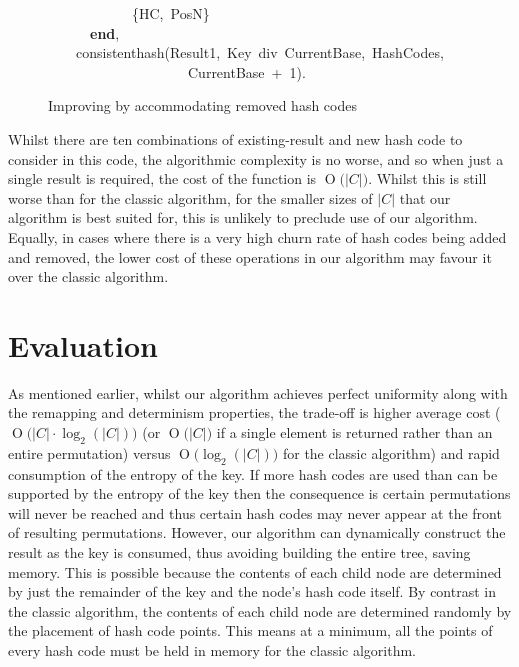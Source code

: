 \documentclass[runningheads,a4paper]{llncs}
\newcommand{\hlstd}[1]{\textcolor[rgb]{0,0,0}{#1}}
\newcommand{\hlnum}[1]{\textcolor[rgb]{0.69,0.49,0}{#1}}
\newcommand{\hlopt}[1]{\textcolor[rgb]{0,0,0}{#1}}
\newcommand{\hlkwa}[1]{\textcolor[rgb]{0,0,0}{\bf{#1}}}
\newcommand{\hlkwd}[1]{\textcolor[rgb]{0,0,0.51}{#1}}
\newcommand{\BigO}[1]{\ensuremath{\operatorname{O}\bigl(#1\bigr)}}
\begin{document}
\begin{figure}
\hlstd{}\hlstd{\ \ \ \ \ \ \ \ \ \ \ \ }\hlstd{}\hlopt{\{}\hlstd{HC}\hlopt{,\ }\hlstd{PosN}\hlopt{\}}\hspace*{\fill}\\
\hlstd{}\hlstd{\ \ \ \ \ \ }\hlstd{}\hlkwa{end}\hlstd{}\hlopt{,}\hspace*{\fill}\\
\hlstd{}\hlstd{\ \ \ \ }\hlstd{}\hlkwd{consistent\textunderscore hash}\hlstd{}\hlopt{(}\hlstd{Result1}\hlopt{,\ }\hlstd{Key\ div\ CurrentBase}\hlopt{,\ }\hlstd{HashCodes}\hlopt{,}\hspace*{\fill}\\
\hlstd{}\hlstd{\ \ \ \ \ \ \ \ \ \ \ \ \ \ \ \ \ \ \ \ }\hlstd{CurrentBase\ }\hlopt{+\ }\hlstd{}\hlnum{1}\hlstd{}\hlopt{).}\hspace*{\fill}\\
\mbox{}
\normalfont
\normalsize
\caption{Improving  by accommodating removed hash codes}
\label{fig:code:new-one-result-marker}
\end{figure}

Whilst there are ten combinations of existing-result and new hash code
to consider in this code, the algorithmic complexity is no worse, and
so when just a single result is required, the cost of the function is
$\BigO{|C|}$. Whilst this is still worse than for the classic
algorithm, for the smaller sizes of $|C|$ that our algorithm is best
suited for, this is unlikely to preclude use of our
algorithm. Equally, in cases where there is a very high churn rate of
hash codes being added and removed, the lower cost of these operations
in our algorithm may favour it over the classic algorithm.

\section{Evaluation}

As mentioned earlier, whilst our algorithm achieves perfect uniformity
along with the remapping and determinism properties, the trade-off is
higher average cost ($\BigO{|C| \cdot \log_2(|C|)}$ (or $\BigO{|C|}$
if a single element is returned rather than an entire permutation)
versus $\BigO{\log_2(|C|)}$ for the classic algorithm) and rapid
consumption of the entropy of the key. If more hash codes are used
than can be supported by the entropy of the key then the consequence
is certain permutations will never be reached and thus certain hash
codes may never appear at the front of resulting
permutations. However, our algorithm can dynamically construct the
result as the key is consumed, thus avoiding building the entire tree,
saving memory. This is possible because the contents of each child
node are determined by just the remainder of the key and the node's
hash code itself. By contrast in the classic algorithm, the contents
of each child node are determined randomly by the placement of hash
code points. This means at a minimum, all the points of every hash
code must be held in memory for the classic algorithm.
\end{document}

